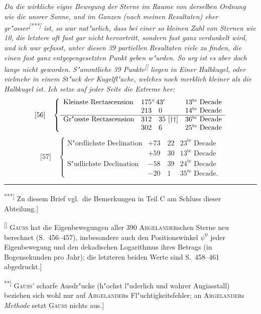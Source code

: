 \documentclass[12pt,a4paper]{article}
\theoremstyle{plain}
\theoremstyle{definition}
\theoremstyle{remark}
\begin{document}
{{\itshape Da die wirkliche eigne Bewegung der Sterne im Raume von derselben Ordnung wie die unsrer Sonne, und im Ganzen (nach meinen Resultaten) eher gr"osser\textsuperscript{[***]} ist, so war nat"urlich, dass bei einer so kleinen Zahl von Sternen wie 10, die letztere oft fast gar nicht hervortritt, sondern fast ganz verdunkelt wird, und ich war gefasst, unter diesen 39 partiellen Resultaten viele zu finden, die einen fast ganz entgegengesetzten Punkt geben w"urden. So arg ist es aber doch lange nicht geworden. S"ammtliche 39 Punkte\textsuperscript{[\textdagger]} liegen in Einer Halbkugel, oder vielmehr in einem St"uck der Kugelfl"ache, welches noch merklich kleiner als die Halbkugel ist. Ich setze auf jeder Seite die Extreme her:}
\[
\text{[56]}\quad
\left\{\begin{array}{lll}
\text{Kleinste Rectascension} & 175^{\circ}\,43' & 13^{\text{te}}\text{ Decade}\\
                              & 213\quad 0      & 14^{\text{te}}\text{ Decade}\\
\hline
\text{Gr"osste Rectascension} & 312\quad 35\ [\text{\textdagger\textdagger}] & 36^{\text{te}}\text{ Decade}\\
                              & 302\quad 6      & 25^{\text{te}}\text{ Decade}
\end{array}\right.
\]
\[
\text{[57]}\quad
\left\{\begin{array}{lll}
\text{N"ordlichste Declination} & +73\quad 22 & 23^{\text{te}}\text{ Decade}\\
                                 & +59\quad 30 & 13^{\text{te}}\text{ Decade}\\
\hline
\text{S"udlichste Declination} & -58\quad 39 & 24^{\text{te}}\text{ Decade}\\
                                & -20\quad 1  & 35^{\text{te}}\text{ Decade.}
\end{array}\right.
\]

\rule{\textwidth}{0.4pt}
{\small
\textsuperscript{***]} Zu diesem Brief vgl.\ die Bemerkungen in Teil C am Schluss dieser Abteilung.]

\textsuperscript{[\textdagger]} \textsc{Gauss} hat die Eigenbewegungen aller 390 \textsc{Argelander}schen Sterne neu berechnet (S.\ 456--457), insbesondere auch den Positionswinkel $\psi^0$ jeder Eigenbewegung und den dekadischen Logarithmus ihres Betrags (in Bogensekunden pro Jahr); die letzteren beiden Werte sind S.\ 458--461 abgedruckt.]

\textsuperscript{**]} \textsc{Gauss}' scharfe Ausdr"ucke (\glq{}h"ochst l"uderlich\grq{} und \glq{}wahrer Augiasstall\grq{}) beziehen sich wohl nur auf \textsc{Argelander}s Fl"uchtigkeitsfehler; an \textsc{Argelander}s {\itshape Methode} setzt \textsc{Gauss} nichts aus.]

}}
\end{document}

